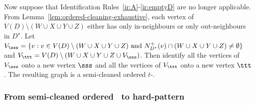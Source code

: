 Now suppose that Identification Rules~\ref{ir:A}-\ref{ir:emptyD} are no longer applicable. From Lemma~\ref{lem:ordered-cleaning-exhaustive}, each vertex of $V(D) \setminus (W \cup X \cup Y \cup Z)$ either has only in-neighbours or only out-neighbours in $D^{\star}$.
Let $V_{\sss} =\{v : v \in V(D) \setminus (W \cup X \cup Y \cup Z) \text{ and } N_{D^{\star}}^+(v) \cap (W \cup X \cup Y \cup Z) \neq \emptyset \}$ and
$V_{\ttt} = V(D) \setminus (W \cup X \cup Y \cup Z \cup V_{\sss})$. Then identify all the vertices of $V_{\sss}$ onto a new vertex $\sss$ and all the vertices of $V_{\ttt}$ onto a new vertex $\ttt$. The resulting graph is a semi-cleaned ordered $t$-\toughpair.

\subsubsection{From semi-cleaned ordered \toughpair\ to hard-pattern}
\label{sec:semicleantoclean}

